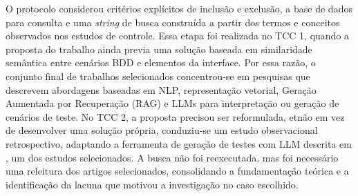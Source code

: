 O protocolo considerou critérios explícitos de inclusão e exclusão, a base de dados para consulta e uma \textit{string} de busca construída a partir dos termos e conceitos observados nos estudos de controle. Essa etapa foi realizada no TCC 1, quando a proposta do trabalho ainda previa uma solução baseada em similaridade semântica entre cenários BDD e elementos da interface. Por essa razão, o conjunto final de trabalhos selecionados concentrou-se em pesquisas que descrevem abordagens baseadas em NLP, representação vetorial, Geração Aumentada por Recuperação (RAG) e LLMs para interpretação ou geração de cenários de teste. No TCC 2, a proposta precisou ser reformulada, etnão em vez de desenvolver uma solução própria, conduziu-se um estudo observacional retrospectivo, adaptando a ferramenta de geração de testes com LLM descrita em , um dos estudos selecionados. A busca não foi reexecutada, mas foi necessário uma releitura dos artigos selecionados, consolidando a fundamentação teórica e a identificação da lacuna que motivou a investigação no caso escolhido.